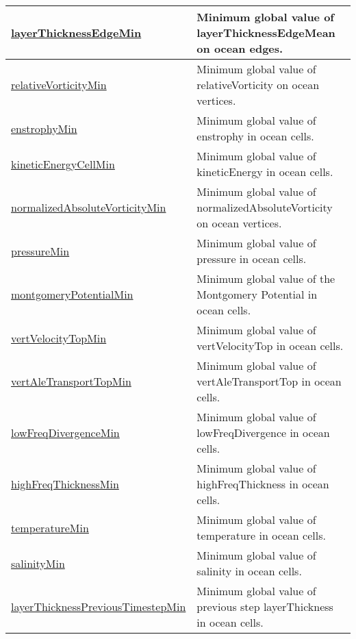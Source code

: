 {\begin{center}
\begin{longtable}{| p{2.0in} | p{4.0in} |}
    \hline
    \hyperref[subsec:var_sec_globalStatsAM_layerThicknessEdgeMin]{layerThicknessEdgeMin} & Minimum global value of layerThicknessEdgeMean on ocean edges. \\
    \hline
    \hyperref[subsec:var_sec_globalStatsAM_relativeVorticityMin]{relativeVorticityMin} & Minimum global value of relativeVorticity on ocean vertices. \\
    \hline
    \hyperref[subsec:var_sec_globalStatsAM_enstrophyMin]{enstrophyMin} & Minimum global value of enstrophy in ocean cells. \\
    \hline
    \hyperref[subsec:var_sec_globalStatsAM_kineticEnergyCellMin]{kineticEnergyCellMin} & Minimum global value of kineticEnergy in ocean cells. \\
    \hline
    \hyperref[subsec:var_sec_globalStatsAM_normalizedAbsoluteVorticityMin]{normalizedAbsoluteVorticityMin} & Minimum global value of normalizedAbsoluteVorticity on ocean vertices. \\
    \hline
    \hyperref[subsec:var_sec_globalStatsAM_pressureMin]{pressureMin} & Minimum global value of pressure in ocean cells. \\
    \hline
    \hyperref[subsec:var_sec_globalStatsAM_montgomeryPotentialMin]{montgomeryPotentialMin} & Minimum global value of the Montgomery Potential in ocean cells. \\
    \hline
    \hyperref[subsec:var_sec_globalStatsAM_vertVelocityTopMin]{vertVelocityTopMin} & Minimum global value of vertVelocityTop in ocean cells. \\
    \hline
    \hyperref[subsec:var_sec_globalStatsAM_vertAleTransportTopMin]{vertAleTransportTopMin} & Minimum global value of vertAleTransportTop in ocean cells. \\
    \hline
    \hyperref[subsec:var_sec_globalStatsAM_lowFreqDivergenceMin]{lowFreqDivergenceMin} & Minimum global value of lowFreqDivergence in ocean cells. \\
    \hline
    \hyperref[subsec:var_sec_globalStatsAM_highFreqThicknessMin]{highFreqThicknessMin} & Minimum global value of highFreqThickness in ocean cells. \\
    \hline
    \hyperref[subsec:var_sec_globalStatsAM_temperatureMin]{temperatureMin} & Minimum global value of temperature in ocean cells. \\
    \hline
    \hyperref[subsec:var_sec_globalStatsAM_salinityMin]{salinityMin} & Minimum global value of salinity in ocean cells. \\
    \hline
    \hyperref[subsec:var_sec_globalStatsAM_layerThicknessPreviousTimestepMin]{layerThicknessPreviousTimestep\-Min} & Minimum global value of previous step layerThickness in ocean cells. \\

\end{longtable}
\end{center}}
